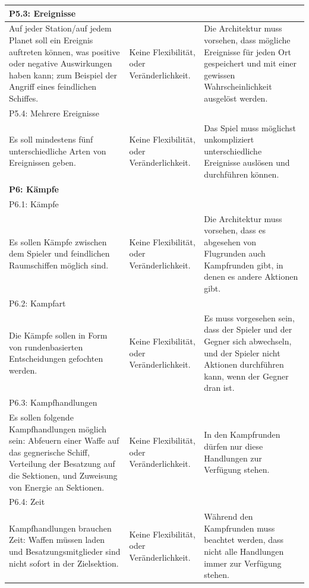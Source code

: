 \documentclass[fontsize=12pt,paper=a4,twoside]{scrartcl}
\begin{document}
\begin{longtable}[c]{|p{5cm}|p{5cm}|p{5cm}|}
\\ \hline
\multicolumn{3}{|l|}{{P5.3: Ereignisse}} 
\\ \hline
Auf jeder Station/auf jedem Planet soll ein Ereignis auftreten können, was positive oder negative Auswirkungen haben kann; zum Beispiel der Angriff eines feindlichen Schiffes.  & Keine Flexibilität, oder Veränderlichkeit.    &  Die Architektur muss vorsehen, dass mögliche Ereignisse für jeden Ort gespeichert und mit einer gewissen Wahrscheinlichkeit ausgelöst werden. 
\\ \hline
\multicolumn{3}{|l|}{{P5.4: Mehrere Ereignisse}} 
\\ \hline
Es soll mindestens fünf unterschiedliche Arten von Ereignissen geben. & Keine Flexibilität, oder Veränderlichkeit.    & Das Spiel muss möglichst unkompliziert unterschiedliche Ereignisse auslösen und durchführen können. 
\\ \hline
%
\multicolumn{3}{|l|}{{\textbf{P6: Kämpfe}}} 
\\ \hline
\multicolumn{3}{|l|}{{P6.1: Kämpfe}} 
\\ \hline
Es sollen Kämpfe zwischen dem Spieler und feindlichen Raumschiffen möglich sind. & Keine Flexibilität, oder Veränderlichkeit.    & Die Architektur muss vorsehen, dass es abgesehen von Flugrunden auch Kampfrunden gibt, in denen es andere Aktionen gibt.
\\ \hline
\multicolumn{3}{|l|}{{P6.2: Kampfart}} 
\\ \hline
Die Kämpfe sollen in Form von rundenbasierten Entscheidungen gefochten werden. & Keine Flexibilität, oder Veränderlichkeit.    &  Es muss vorgesehen sein, dass der Spieler und der Gegner sich abwechseln, und der Spieler nicht Aktionen durchführen kann, wenn der Gegner dran ist. 
\\ \hline
\multicolumn{3}{|l|}{{P6.3: Kampfhandlungen}} 
\\ \hline
Es sollen folgende Kampfhandlungen möglich sein: Abfeuern einer Waffe auf das gegnerische Schiff, Verteilung der Besatzung auf die Sektionen, und Zuweisung von Energie an Sektionen. & Keine Flexibilität, oder Veränderlichkeit.    &  In den Kampfrunden dürfen nur diese Handlungen zur Verfügung stehen.
\\ \hline
\multicolumn{3}{|l|}{{P6.4: Zeit}} 
\\ \hline
Kampfhandlungen brauchen Zeit: Waffen müssen laden und Besatzungsmitglieder sind nicht sofort in der Zielsektion. & Keine Flexibilität, oder Veränderlichkeit.    & Während den Kampfrunden muss beachtet werden, dass nicht alle Handlungen immer zur Verfügung stehen. 

\end{longtable}
\end{document}

